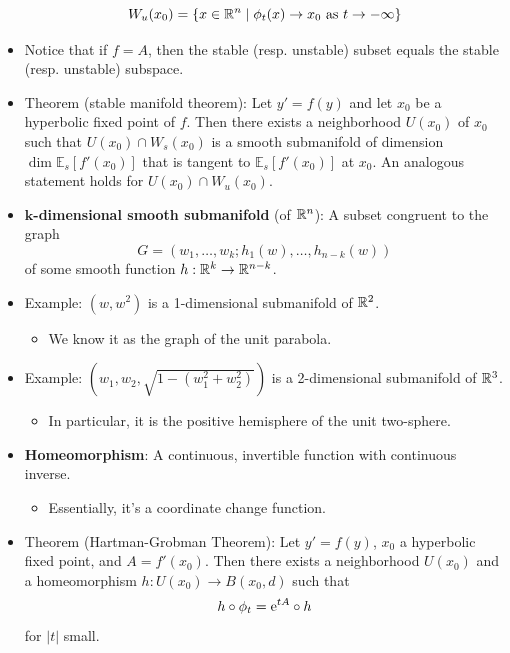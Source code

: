 \documentclass[../notes.tex]{subfiles}
\begin{document}
\begin{itemize}
\begin{equation*}
        W_u(x_0) = \{x\in\R^n\mid\phi_t(x)\to x_0\text{ as }t\to -\infty\}
    \end{equation*}
    \item Notice that if $f=A$, then the stable (resp. unstable) subset equals the stable (resp. unstable) subspace.
    \item Theorem (stable manifold theorem): Let $y'=f(y)$ and let $x_0$ be a hyperbolic fixed point of $f$. Then there exists a neighborhood $U(x_0)$ of $x_0$ such that $U(x_0)\cap W_s(x_0)$ is a smooth submanifold of dimension $\dim\mathbb{E}_s[f'(x_0)]$ that is tangent to $\mathbb{E}_s[f'(x_0)]$ at $x_0$. An analogous statement holds for $U(x_0)\cap W_u(x_0)$.
    \item \textbf{$\bm{k}$-dimensional smooth submanifold} (of $\R^n$): A subset congruent to the graph
    \begin{equation*}
        G = (w_1,\dots,w_k;h_1(w),\dots,h_{n-k}(w))
    \end{equation*}
    of some smooth function $h:\R^k\to\R^{n-k}$.
    \item Example: $(w,w^2)$ is a 1-dimensional submanifold of $\R^2$.
    \begin{itemize}
        \item We know it as the graph of the unit parabola.
    \end{itemize}
    \item Example: $\left( w_1,w_2,\sqrt{1-(w_1^2+w_2^2)} \right)$ is a 2-dimensional submanifold of $\R^3$.
    \begin{itemize}
        \item In particular, it is the positive hemisphere of the unit two-sphere.
    \end{itemize}
    \item \textbf{Homeomorphism}: A continuous, invertible function with continuous inverse.
    \begin{itemize}
        \item Essentially, it's a coordinate change function.
    \end{itemize}
    \item Theorem (Hartman-Grobman Theorem): Let $y'=f(y)$, $x_0$ a hyperbolic fixed point, and $A=f'(x_0)$. Then there exists a neighborhood $U(x_0)$ and a homeomorphism $h:U(x_0)\to B(x_0,d)$ such that
    \begin{equation*}
        h\circ\phi_t = \e[tA]\circ h
    \end{equation*}
    for $|t|$ small.
    \begin{figure}[h!]

\end{figure}
\end{itemize}
\end{document}
